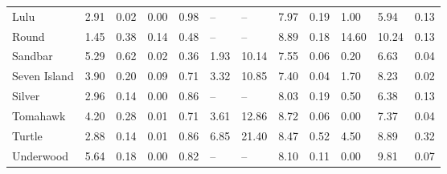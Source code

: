 \documentclass{article}
\begin{document}
\begin{landscape}
\begin{table}
\begin{tabular}{@{}llllp{14mm}p{12mm}p{13mm}lp{15mm}p{15mm}ll@{}}
  Lulu & 2.91 & 0.02 & 0.00 & 0.98 & -- & -- & 7.97 & 0.19 & 1.00 & 5.94 & 0.13 \\ 
  Round & 1.45 & 0.38 & 0.14 & 0.48 & -- & -- & 8.89 & 0.18 & 14.60 & 10.24 & 0.13 \\ 
  Sandbar & 5.29 & 0.62 & 0.02 & 0.36 & 1.93 & 10.14 & 7.55 & 0.06 & 0.20 & 6.63 & 0.04 \\ 
  Seven Island & 3.90 & 0.20 & 0.09 & 0.71 & 3.32 & 10.85 & 7.40 & 0.04 & 1.70 & 8.23 & 0.02 \\ 
  Silver & 2.96 & 0.14 & 0.00 & 0.86 & -- & -- & 8.03 & 0.19 & 0.50 & 6.38 & 0.13 \\ 
  Tomahawk & 4.20 & 0.28 & 0.01 & 0.71 & 3.61 & 12.86 & 8.72 & 0.06 & 0.00 & 7.37 & 0.04 \\ 
  Turtle & 2.88 & 0.14 & 0.01 & 0.86 & 6.85 & 21.40 & 8.47 & 0.52 & 4.50 & 8.89 & 0.32 \\ 
  Underwood & 5.64 & 0.18 & 0.00 & 0.82 & -- & -- & 8.10 & 0.11 & 0.00 & 9.81 & 0.07 \\ 
\bottomrule
\end{tabular}
\end{table}
\end{landscape}
\end{document}
